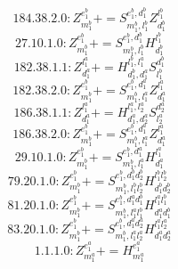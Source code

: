 \documentclass[letterpaper,10pt,fleqn,leqno,onecolumn]{article}
\begin{document}
\begin{equation} \;\;\;\;\;\;  184.38.2.0: Z^{e_{1}^{b}}_{m_{1}^{b}}+=S^{e_{1}^{b},d_{1}^{b}}_{m_{1}^{b},l_{1}^{b}}Z^{l_{1}^{b}}_{d_{1}^{b}} \end{equation}
\begin{equation} \;\;\;\;\;\;  27.10.1.0: Z^{e_{1}^{b}}_{m_{1}^{b}}+=S^{e_{1}^{b},d_{1}^{b}}_{m_{1}^{b},l_{1}^{b}}H^{l_{1}^{b}}_{d_{1}^{b}} \end{equation}
\begin{equation} \;\;\;\;\;\;  182.38.1.1: Z^{l_{1}^{a}}_{d_{1}^{a}}+=H^{l_{1}^{b},l_{1}^{a}}_{d_{1}^{b},d_{1}^{a}}S^{d_{1}^{b}}_{l_{1}^{b}} \end{equation}
\begin{equation} \;\;\;\;\;\;  182.38.2.0: Z^{e_{1}^{b}}_{m_{1}^{b}}+=S^{e_{1}^{b},d_{1}^{a}}_{m_{1}^{b},l_{1}^{a}}Z^{l_{1}^{a}}_{d_{1}^{a}} \end{equation}
\begin{equation} \;\;\;\;\;\;  186.38.1.1: Z^{l_{1}^{a}}_{d_{1}^{a}}+=H^{l_{1}^{a},l_{2}^{a}}_{d_{1}^{a},d_{2}^{a}}S^{d_{2}^{a}}_{l_{2}^{a}} \end{equation}
\begin{equation} \;\;\;\;\;\;  186.38.2.0: Z^{e_{1}^{b}}_{m_{1}^{b}}+=S^{e_{1}^{b},d_{1}^{a}}_{m_{1}^{b},l_{1}^{a}}Z^{l_{1}^{a}}_{d_{1}^{a}} \end{equation}
\begin{equation} \;\;\;\;\;\;  29.10.1.0: Z^{e_{1}^{b}}_{m_{1}^{b}}+=S^{e_{1}^{b},d_{1}^{a}}_{m_{1}^{b},l_{1}^{a}}H^{l_{1}^{a}}_{d_{1}^{a}} \end{equation}
\begin{equation} \;\;\;\;\;\;  79.20.1.0: Z^{e_{1}^{b}}_{m_{1}^{b}}+=S^{e_{1}^{b},d_{1}^{b}d_{2}^{b}}_{m_{1}^{b},l_{1}^{b}l_{2}^{b}}H^{l_{1}^{b}l_{2}^{b}}_{d_{1}^{b}d_{2}^{b}} \end{equation}
\begin{equation} \;\;\;\;\;\;  81.20.1.0: Z^{e_{1}^{b}}_{m_{1}^{b}}+=S^{e_{1}^{b},d_{1}^{a}d_{1}^{b}}_{m_{1}^{b},l_{1}^{a}l_{1}^{b}}H^{l_{1}^{a}l_{1}^{b}}_{d_{1}^{a}d_{1}^{b}} \end{equation}
\begin{equation} \;\;\;\;\;\;  83.20.1.0: Z^{e_{1}^{b}}_{m_{1}^{b}}+=S^{e_{1}^{b},d_{1}^{a}d_{2}^{a}}_{m_{1}^{b},l_{1}^{a}l_{2}^{a}}H^{l_{1}^{a}l_{2}^{a}}_{d_{1}^{a}d_{2}^{a}} \end{equation}
\begin{equation} \;\;\;\;\;\;  1.1.1.0: Z^{e_{1}^{a}}_{m_{1}^{a}}+=H^{e_{1}^{a}}_{m_{1}^{a}} \end{equation}
\end{document}
